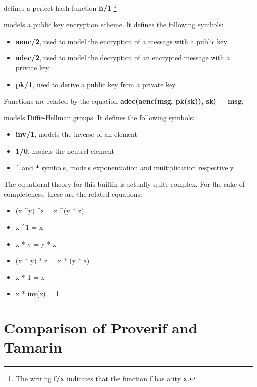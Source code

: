 \begin{description}[style=nextline]
    \item[hashing] defines a perfect hash function \textbf{h/1} \footnote{The writing \textbf{f/x} indicates that the function \textbf{f} has arity \textbf{x}.}
    \item[asymmetric-encryption] models a public key encryption scheme. It defines the following symbols:
    
    \begin{itemize}
        \item{\textbf{aenc/2}, used to model the encryption of a message with a public key}
        \item{\textbf{adec/2}, used to model the decryption of an encrypted message with a private key}
        \item{\textbf{pk/1}, used to derive a public key from a private key}
    \end{itemize}

    Functions are related by the equation \textbf{adec(aenc(msg, pk(sk)), sk) = msg}.

    \item[diffie-hellman] models Diffie-Hellman groups. It defines the following symbols:
    
    \begin{itemize}
        \item{\textbf{inv/1}, models the inverse of an element}
        \item{\textbf{1/0}, models the neutral element}
        \item{\textbf{\textasciicircum} and \textbf{*} symbols, models exponentiation and multiplication respectively}
    \end{itemize}

    The equational theory for this builtin is actually quite complex. For the sake of completeness, these are the related equations:
    \begin{itemize}
        \item{(x \textasciicircum y) \textasciicircum z = x \textasciicircum (y * z)}
        \item{x \textasciicircum 1 = x}
        \item{x * y = y * x}
        \item{(x * y) * z = x * (y * z)}
        \item{x * 1 = x}
        \item{x * inv(x) = 1}
    \end{itemize}
\end{description}

\section{Comparison of Proverif and Tamarin}